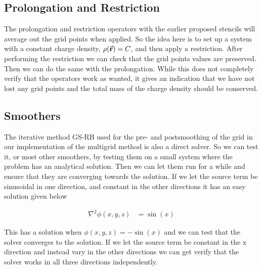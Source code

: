 \subsection{Prolongation and Restriction}


	The prolongation and restriction operators with the earlier proposed stencils
 	will average out the grid points when applied. So the idea here is to set up a
 	system with a constant charge density, \(\rho(\va{r}) = C\), and then apply a
	restriction. After performing the restriction we can check that the grid points
	values are preserved. Then we can do the same with the prolongation. While this
	does not completely verify that the operators work as wanted, it gives an indication
	that we have not lost any grid points and the total mass of the charge density should be conserved.

\subsection{Smoothers}

	The iterative method GS-RB used for the pre- and postsmoothing of the grid in
	our implementation of the multigrid method is also a direct solver.
	So we can test it, or most other smoothers, by testing them on a small system
	where the problem has an analytical solution. Then we can let them run for a
	while and ensure that they are converging towards the solution. If we let
	the source term be sinusoidal in one direction, and constant in the other
	directions it has an easy solution given below

	\begin{align}
		\nabla^2 \phi(x,y,z) &= \sin(x)
	\end{align}

	This has a solution when \(\phi(x,y,z) = -\sin(x)\) and we can test that the
	solver converges to the solution. If we let the source term be constant in the
	x direction and instead vary in the other directions we can get verify that the
	solver works in all three directions independently.

